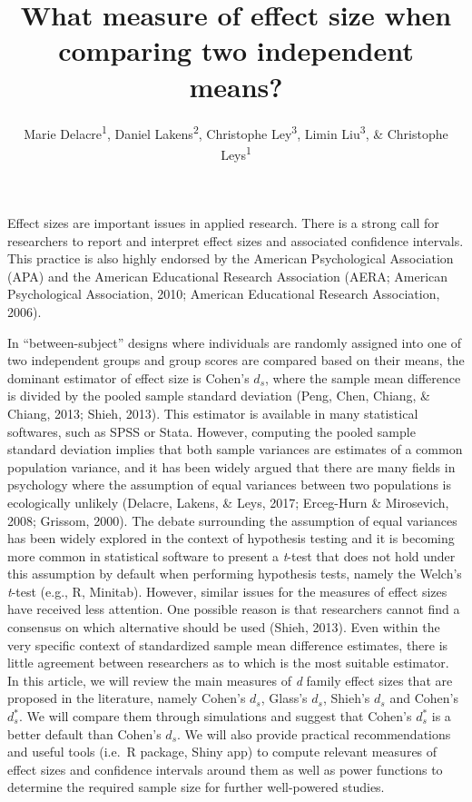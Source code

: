 \documentclass[
  english,
  man,floatsintext]{apa6}
\title{What measure of effect size when comparing two independent means?}
\author{Marie Delacre\textsuperscript{1}, Daniel Lakens\textsuperscript{2}, Christophe Ley\textsuperscript{3}, Limin Liu\textsuperscript{3}, \& Christophe Leys\textsuperscript{1}}
\date{}
\affiliation{\vspace{0.5cm}\textsuperscript{1} Université Libre de Bruxelles, Service of Analysis of the Data (SAD), Bruxelles, Belgium\\\textsuperscript{2} Eindhoven University of Technology, Human Technology Interaction Group, Eindhoven, the Netherlands\\\textsuperscript{3} Universiteit Gent, Department of Applied Mathematics, Computer Science and Statistics, Gent, Belgium}
\begin{document}
\maketitle

Effect sizes are important issues in applied research. There is a strong call for researchers to report and interpret effect sizes and associated confidence intervals. This practice is also highly endorsed by the American Psychological Association (APA) and the American Educational Research Association (AERA; American Psychological Association, 2010; American Educational Research Association, 2006).

In \enquote{between-subject} designs where individuals are randomly assigned into one of two independent groups and group scores are compared based on their means, the dominant estimator of effect size is Cohen's \(d_s\), where the sample mean difference is divided by the pooled sample standard deviation (Peng, Chen, Chiang, \& Chiang, 2013; Shieh, 2013). This estimator is available in many statistical softwares, such as SPSS or Stata. However, computing the pooled sample standard deviation implies that both sample variances are estimates of a common population variance, and it has been widely argued that there are many fields in psychology where the assumption of equal variances between two populations is ecologically unlikely (Delacre, Lakens, \& Leys, 2017; Erceg-Hurn \& Mirosevich, 2008; Grissom, 2000). The debate surrounding the assumption of equal variances has been widely explored in the context of hypothesis testing and it is becoming more common in statistical software to present a \emph{t}-test that does not hold under this assumption by default when performing hypothesis tests, namely the Welch's \emph{t}-test (e.g., R, Minitab). However, similar issues for the measures of effect sizes have received less attention. One possible reason is that researchers cannot find a consensus on which alternative should be used (Shieh, 2013). Even within the very specific context of standardized sample mean difference estimates, there is little agreement between researchers as to which is the most suitable estimator. In this article, we will review the main measures of \emph{d} family effect sizes that are proposed in the literature, namely Cohen's \(d_s\), Glass's \(d_s\), Shieh's \(d_s\) and Cohen's \(d^*_s\). We will compare them through simulations and suggest that Cohen's \(d^*_s\) is a better default than Cohen's \(d_s\). We will also provide practical recommendations and useful tools (i.e.~R package, Shiny app) to compute relevant measures of effect sizes and confidence intervals around them as well as power functions to determine the required sample size for further well-powered studies.
\end{document}
